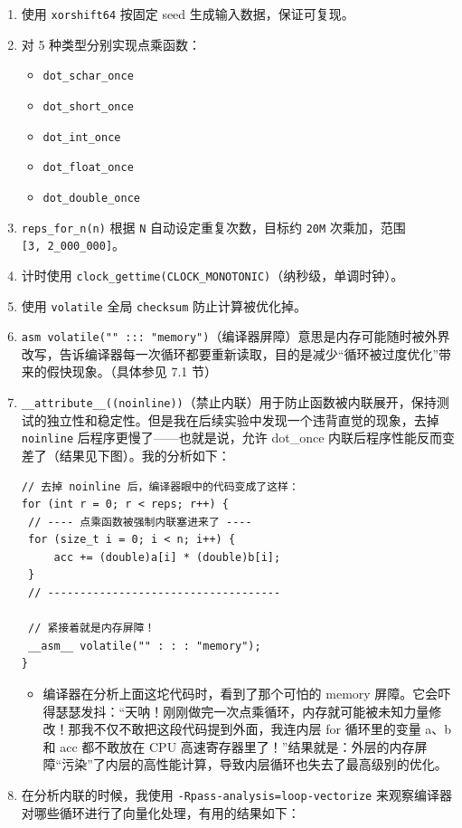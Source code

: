 \documentclass[12pt,fontset=none]{ctexart}
\providecommand{\tightlist}{%
  \setlength{\itemsep}{0pt}\setlength{\parskip}{0pt}}
\begin{document}
\begin{enumerate}
\def\labelenumi{\arabic{enumi}.}
\item
  使用 \texttt{xorshift64} 按固定 seed 生成输入数据，保证可复现。
\item
  对 5 种类型分别实现点乘函数：

  \begin{itemize}
  \tightlist
  \item
    \texttt{dot\_schar\_once}
  \item
    \texttt{dot\_short\_once}
  \item
    \texttt{dot\_int\_once}
  \item
    \texttt{dot\_float\_once}
  \item
    \texttt{dot\_double\_once}
  \end{itemize}
\item
  \texttt{reps\_for\_n(n)} 根据 \texttt{N} 自动设定重复次数，目标约
  \texttt{20M} 次乘加，范围 \texttt{{[}3,\ 2\_000\_000{]}}。
\item
  计时使用
  \texttt{clock\_gettime(CLOCK\_MONOTONIC)}（纳秒级，单调时钟）。
\item
  使用 \texttt{volatile} 全局 \texttt{checksum} 防止计算被优化掉。
\item
  \texttt{asm\ volatile(""\ :::\ "memory")}（编译器屏障）意思是内存可能随时被外界改写，告诉编译器每一次循环都要重新读取，目的是减少``循环被过度优化''带来的假快现象。（具体参见
  7.1 节）
\item
  \texttt{\_\_attribute\_\_((noinline))}（禁止内联）用于防止函数被内联展开，保持测试的独立性和稳定性。但是我在后续实验中发现一个违背直觉的现象，去掉
  \texttt{noinline} 后程序更慢了------也就是说，允许 dot\_once
  内联后程序性能反而变差了（结果见下图）。我的分析如下：

\begin{verbatim}
// 去掉 noinline 后，编译器眼中的代码变成了这样：
for (int r = 0; r < reps; r++) {
 // ---- 点乘函数被强制内联塞进来了 ----
 for (size_t i = 0; i < n; i++) {
     acc += (double)a[i] * (double)b[i];
 }
 // ------------------------------------
 
 // 紧接着就是内存屏障！
 __asm__ volatile("" : : : "memory"); 
}
\end{verbatim}

  \begin{itemize}
  \tightlist
  \item
    编译器在分析上面这坨代码时，看到了那个可怕的 memory
    屏障。它会吓得瑟瑟发抖：``天呐！刚刚做完一次点乘循环，内存就可能被未知力量修改！那我不仅不敢把这段代码提到外面，我连内层
    for 循环里的变量 a、b 和 acc 都不敢放在 CPU
    高速寄存器里了！''结果就是：外层的内存屏障``污染''了内层的高性能计算，导致内层循环也失去了最高级别的优化。
  \end{itemize}
\item
  在分析内联的时候，我使用 \texttt{-Rpass-analysis=loop-vectorize}
  来观察编译器对哪些循环进行了向量化处理，有用的结果如下：


\end{enumerate}
\end{document}

